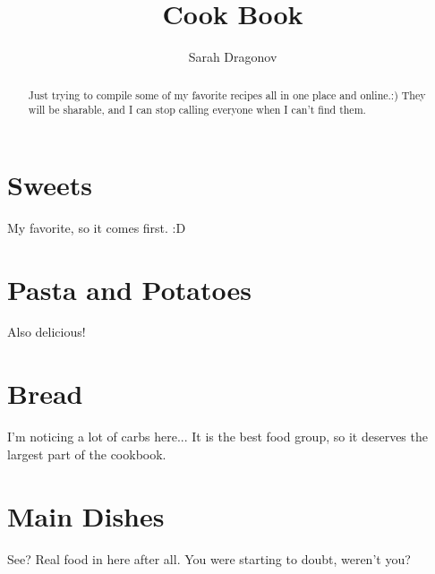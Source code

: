\documentclass[%
a4paper,
11pt
]{article}
\begin{document}
\title{Cook Book}
\author{Sarah Dragonov}
\maketitle

\begin{abstract}
    \noindent Just trying to compile some of my favorite recipes all in one place and online.:)  They will be sharable, and I can stop calling everyone when I can't find them.
\end{abstract}

\tableofcontents

\vspace{5em}

\section{Sweets}
My favorite, so it comes first.  :D


%

































\section{Pasta and Potatoes}
Also delicious!






\section{Bread}
I'm noticing a lot of carbs here...  It is the best food group, so it deserves the largest part of the cookbook.
















\section{Main Dishes}
See?  Real food in here after all.  You were starting to doubt, weren't you?




\end{document}
